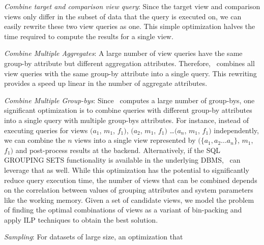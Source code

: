\begin{denselist}
  \item {\it Combine target and comparison view query}: Since the target view
  and comparison views only differ in the subset of data that the query is
  executed on, we can easily rewrite these two view queries as one.
  This simple optimization halves the time required to compute the results for
  a single view. 
  \item {\it Combine Multiple Aggregates}: A large number of view
  queries have the same group-by attribute but different aggregation attributes.
  Therefore, \SeeDB\ combines all view queries with the same group-by attribute
  into a single query. This rewriting provides a speed up linear in the
  number of aggregate attributes.
  \item {\it Combine Multiple Group-bys}: 
  Since \SeeDB\ computes a large number of group-bys, one significant
  optimization is to combine queries with different
  group-by attributes into a single query with multiple group-bys attributes.
  For instance, instead of executing queries for views $(a_1$, $m_1$, $f_1)$,
  $(a_2$, $m_1$, $f_1)$ \ldots $(a_n$, $m_1$, $f_1)$ independently, 
  we can combine the $n$ views into a single view represented by
  $(\{a_1, a_2\ldots a_n\}$, $m_1$, $f_1)$ and post-process results at the
  backend. Alternatively, if the SQL GROUPING SETS functionality is available in
  the underlying DBMS, \SeeDB\ can leverage that as well. 
  While this optimization has the potential to significantly reduce query
  execution time, the number of views that can be combined depends
  on the correlation between values of grouping attributes and system parameters like the
  working memory. Given a set of candidate views, we model the
  problem of finding the optimal combinations of views as a variant of
  bin-packing and apply ILP techniques to obtain the best solution. \\
  \item {\it Sampling}: For datasets of large size, an optimization that

\end{denselist}
